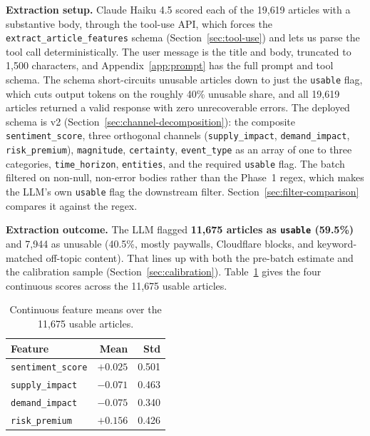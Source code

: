 \textbf{Extraction setup.} Claude Haiku 4.5 scored each of the 19{,}619 articles with a substantive body, through the tool-use API, which forces the \texttt{extract\_article\_features} schema (Section~\ref{sec:tool-use}) and lets us parse the tool call deterministically. The user message is the title and body, truncated to 1{,}500 characters, and Appendix~\ref{app:prompt} has the full prompt and tool schema. The schema short-circuits unusable articles down to just the \texttt{usable} flag, which cuts output tokens on the roughly 40\% unusable share, and all 19{,}619 articles returned a valid response with zero unrecoverable errors. The deployed schema is v2 (Section~\ref{sec:channel-decomposition}): the composite \texttt{sentiment\_score}, three orthogonal channels (\texttt{supply\_impact}, \texttt{demand\_impact}, \texttt{risk\_premium}), \texttt{magnitude}, \texttt{certainty}, \texttt{event\_type} as an array of one to three categories, \texttt{time\_horizon}, \texttt{entities}, and the required \texttt{usable} flag. The batch filtered on non-null, non-error bodies rather than the Phase~1 regex, which makes the LLM's own \texttt{usable} flag the downstream filter. Section~\ref{sec:filter-comparison} compares it against the regex.

\textbf{Extraction outcome.} The LLM flagged \textbf{11{,}675 articles as \texttt{usable} (59.5\%)} and 7{,}944 as unusable (40.5\%, mostly paywalls, Cloudflare blocks, and keyword-matched off-topic content). That lines up with both the pre-batch estimate and the calibration sample (Section~\ref{sec:calibration}). Table~\ref{tab:extraction-means} gives the four continuous scores across the 11{,}675 usable articles.

\begin{table}[h]
  \centering
  \caption{Continuous feature means over the 11{,}675 usable articles.}
  \label{tab:extraction-means}
  \begin{tabular}{@{}lrr@{}}
    \toprule
    Feature & Mean & Std \\
    \midrule
    \texttt{sentiment\_score} & $+0.025$ & 0.501 \\
    \texttt{supply\_impact} & $-0.071$ & 0.463 \\
    \texttt{demand\_impact} & $-0.075$ & 0.340 \\
    \texttt{risk\_premium} & $+0.156$ & 0.426 \\
    \bottomrule
  \end{tabular}
\end{table}

